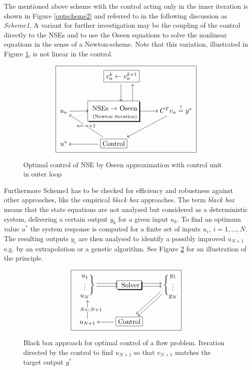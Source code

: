 \documentclass[a4paper,10pt,BCOR=15mm]{scrbook}
\begin{document}
The mentioned above scheme with the control acting only in the inner iteration is shown in Figure \ref{optscheme2} and referred to in the following discussion as \textit{Scheme1}. A variant for further investigation  may be the coupling of the control directly to the NSEs and to use the Oseen equations to solve the nonlinear equations in the sense of a Newton-scheme. Note that this variation, illustrated in Figure \ref{optscheme3}, is not linear in the control.

\begin{figure}[htbp]
\begin{equation*}
\boxed{
 \xymatrix{
&  ~~~~~~~\framebox{$v_n^k \leftarrow v_n^{k+1}$}\ar@<2.5ex>[d]\\
u_n  \ar[r] &*+[F-,]\txt{ ~\\ ~NSEs $\rightarrow$ Oseen  \\ ~\scriptsize{(Newton iteration)}} \ar[r] \ar@<-6.5ex>[u] & C^Tv_n \stackrel{!}{=}y^* \ar[dl] \\  
u^*&  \framebox{Control} \ar [l] \ar[lu]|- {n \leftarrow n+1 } & \\
}
}
\end{equation*}
\caption{Optimal control of NSE by Oseen approximation with control unit in outer loop}
\label{optscheme3}
\end{figure}

Furthermore Scheme1 has to be checked for efficiency and robustness against other approaches, like the empirical \textit{black box} approaches. The term \textit{black box} means that the state equations are not analysed but considered as a deterministic system, delivering a certain output $y_k$ for a given input $u_k$. To find an optimum value $u^*$ the system response is computed for a finite set of inputs $u_i, ~i=1,\dotsc,N$. The resulting outputs $y_i$ are then analysed to identify a possibly improved $u_{N+1}$ e.g. by an extrapolation or a genetic algorithm. See Figure \ref{blackbox} for an illustration of the principle.

\begin{figure}[htbp]
\begin{equation*}
\boxed{
 \xymatrix{
\txt{$u_1$ \\ $\vdots $ \\ $u_N$} \Biggr \}  \ar@<-0.5ex>[r]\ar@<0.5ex>[r] &*+[F-,]\txt{ Solver} \ar@<-0.5ex>[r]\ar@<0.5ex>[r] & \Biggl \{ \txt{$y_1$ \\ $\vdots $ \\ $y_N$}  \ar@<-0.5ex>[ld]\ar@<0.5ex>[ld] \\  
u_{N+1} \ar[u]|- {~~~N \leftarrow N+1 } &  \framebox{Control} \ar [l] & \\
}
}
\end{equation*}
\caption{Black box approach for optimal control of a flow problem. Iteration directed by the control to find $u_{N+1}$ so that $v_{N+1}$ matches the target output $y^*$}
\label{blackbox}
\end{figure}
\end{document}

